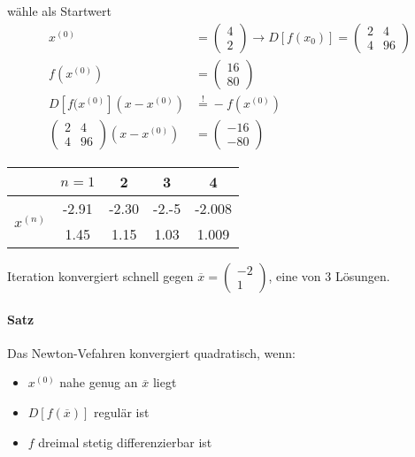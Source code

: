 \documentclass[a4paper,ngerman]{scrbook}
\begin{document}
wähle als Startwert
\begin{align*}
  x^{(0)} &=
  \begin{pmatrix}
    4\\ 2
  \end{pmatrix} \to D[f(x_0)] =
  \begin{pmatrix}
    2 & 4\\ 4 & 96
  \end{pmatrix}\\
    f(x^{(0)}) &=
    \begin{pmatrix}
      16\\ 80
    \end{pmatrix}\\
    D[f(x^{(0)}](x-x^{(0)}) &\overset{!}{=} -f(x^{(0)})\\
    \begin{pmatrix}
      2 & 4\\ 4 & 96
    \end{pmatrix} (x-x^{(0)}) &=
    \begin{pmatrix}
      -16\\ -80
    \end{pmatrix}
\end{align*}

\begin{tabular}{c|c|c|c|c}
  & $n=1$ & 2 & 3 & 4\\\hline
  \multirow{2}{*}{$x^{(n)}$} & -2.91 & -2.30 & -2.-5 & -2.008\\
  & 1.45 & 1.15 & 1.03 & 1.009
\end{tabular}

Iteration konvergiert schnell gegen $\overline{x} =
\begin{pmatrix}
  -2 \\ 1
\end{pmatrix}
$, eine von 3 Lösungen.

\paragraph{Satz}

Das Newton-Vefahren konvergiert quadratisch, wenn:
\begin{itemize}
\item $x^{(0)}$ nahe genug an $\overline{x}$ liegt
\item $D\left[f(\overline{x})\right]$ regulär ist
\item $f$ dreimal stetig differenzierbar ist
\end{itemize}
\end{document}
